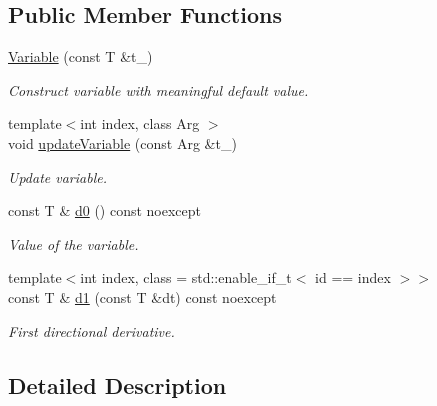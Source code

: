 \subsection*{Public Member Functions}
\begin{DoxyCompactItemize}
\item 
\hypertarget{structFunG_1_1Variable_a10238450dac2ec4c98400b106543ff8f}{\hyperlink{structFunG_1_1Variable_a10238450dac2ec4c98400b106543ff8f}{Variable} (const T \&t\-\_\-)}\label{structFunG_1_1Variable_a10238450dac2ec4c98400b106543ff8f}

\begin{DoxyCompactList}\small\item\em Construct variable with meaningful default value. \end{DoxyCompactList}\item 
\hypertarget{structFunG_1_1Variable_ac8ebfb52a0fadd3f95d1feccd664909e}{{\footnotesize template$<$int index, class Arg $>$ }\\void \hyperlink{structFunG_1_1Variable_ac8ebfb52a0fadd3f95d1feccd664909e}{update\-Variable} (const Arg \&t\-\_\-)}\label{structFunG_1_1Variable_ac8ebfb52a0fadd3f95d1feccd664909e}

\begin{DoxyCompactList}\small\item\em Update variable. \end{DoxyCompactList}\item 
\hypertarget{structFunG_1_1Variable_a8253be17d26f9070da92635a8e6d410f}{const T \& \hyperlink{structFunG_1_1Variable_a8253be17d26f9070da92635a8e6d410f}{d0} () const noexcept}\label{structFunG_1_1Variable_a8253be17d26f9070da92635a8e6d410f}

\begin{DoxyCompactList}\small\item\em Value of the variable. \end{DoxyCompactList}\item 
{\footnotesize template$<$int index, class  = std\-::enable\-\_\-if\-\_\-t$<$ id == index $>$$>$ }\\const T \& \hyperlink{structFunG_1_1Variable_ab96add49c4b2965ce14bc66660d028db}{d1} (const T \&dt) const noexcept
\begin{DoxyCompactList}\small\item\em First directional derivative. \end{DoxyCompactList}\end{DoxyCompactItemize}


\subsection{Detailed Description}
